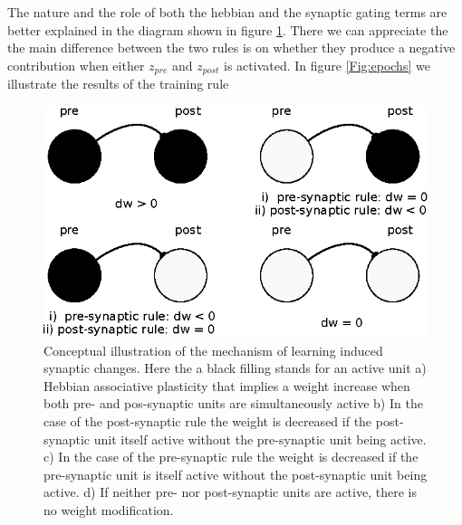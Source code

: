 \documentclass{esannV2}
\begin{document}
The nature and the role of both the hebbian and the synaptic gating terms are better explained in the diagram shown in figure \ref{Fig:plasticity diagram}. There we can appreciate the the main difference between the two rules is on whether they produce a negative contribution when either $z_{pre}$ and $z_{post}$ is activated. In figure \ref{Fig:epochs} we illustrate the results of the training rule

\begin{figure}[h!]
\centering
\includegraphics[scale=1.3]{plasticity_diagram.eps}
\caption{Conceptual illustration of the mechanism of learning induced synaptic changes. Here the a black filling stands for an active unit a) Hebbian associative plasticity that implies a weight increase when both pre- and pos-synaptic units are simultaneously active b) In the case of the post-synaptic rule the weight is decreased if the post-synaptic unit itself active without the pre-synaptic unit being active. c) In the case of the pre-synaptic rule the weight is decreased if the pre-synaptic unit is itself active without the post-synaptic unit being active. d) If neither pre- nor post-synaptic units are active, there is no weight modification.}\label{Fig:plasticity diagram}
\end{figure}
\end{document}
